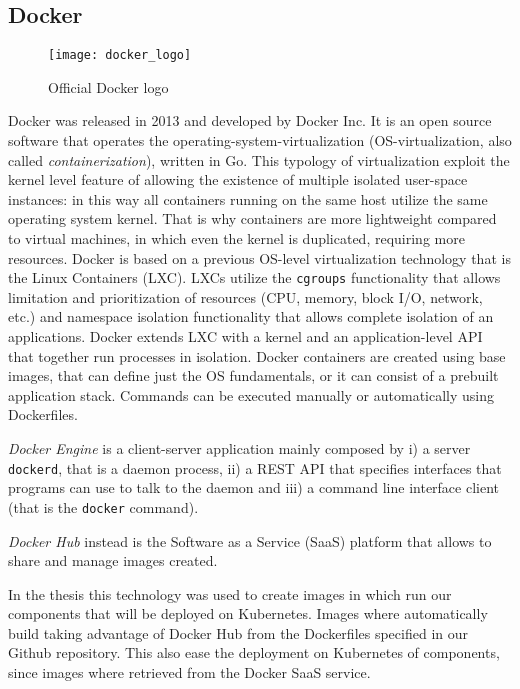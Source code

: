\subsection{Docker}
\begin{figure}[t]
  \centering \texttt{[image: docker\_logo]}
  \caption{Official Docker logo}
  \label{chap:intro:img:docker_logo}
\end{figure}
Docker was released in 2013 and developed by Docker Inc. It is an open source
software that operates the operating-system-virtualization (OS-virtualization,
also called \emph{containerization}), written in Go. This typology of
virtualization exploit the kernel level feature of allowing the existence of
multiple isolated user-space instances: in this way all containers running on
the same host utilize the same operating system kernel. That is why containers
are more lightweight compared to virtual machines, in which even the kernel is
duplicated, requiring more resources. Docker is based on a previous OS-level
virtualization technology that is the Linux Containers (LXC). LXCs utilize the 
\texttt{cgroups} functionality that allows limitation and prioritization of
resources (CPU, memory, block I/O, network, etc.) and namespace isolation
functionality that allows complete isolation of an applications. Docker extends
LXC with a kernel and an application-level API that together run processes in
isolation. Docker containers are created using base images, that can define just
the OS fundamentals, or it can consist of a prebuilt application stack.
Commands can be executed manually or automatically using Dockerfiles.

\emph{Docker Engine} is a client-server application mainly composed by i) a
server \texttt{dockerd}, that is a daemon process, ii) a REST API that specifies
interfaces that programs can use to talk to the daemon and iii) a command line
interface client (that is the \texttt{docker} command).

\emph{Docker Hub} instead is the Software as a Service (SaaS) platform that
allows to share and manage images created.

In the thesis this technology was used to create images in which run our
components that will be deployed on Kubernetes. Images where automatically build
taking advantage of Docker Hub from the Dockerfiles specified in our Github
repository. This also ease the deployment on Kubernetes of components, since
images where retrieved from the Docker SaaS service.

